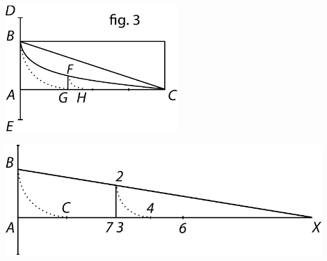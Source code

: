 \pstart 
\hspace{8mm}\begin{minipage}[t]{0.5\textwidth}
\includegraphics[width=0.49\textwidth]{gesamttex/edit_VIII,3/images/dnr-5a_LH_35_09_16_002-003_d5a.pdf}
\end{minipage}
\hspace{-16mm}
\begin{minipage}[t]{0.5\textwidth}
\includegraphics[width=0.9\textwidth]{gesamttex/edit_VIII,3/images/dnr-5b_LH_37_03_071-072_d5b.pdf}
\end{minipage}
